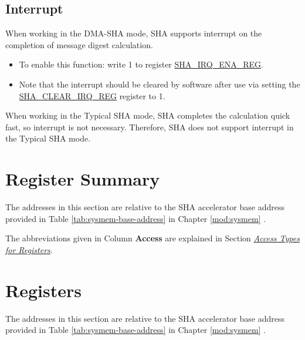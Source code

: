 \documentclass[main\_\_EN.tex]{subfiles}
\begin{document}
\subsection{Interrupt}

When working in the DMA-SHA mode, SHA supports interrupt on the completion of message digest calculation. 
\begin{itemize}
    \item To enable this function: write 1 to register \hyperref[regdesc:SHAIRQENAREG]{SHA\_IRQ\_ENA\_REG}. 
    \item Note that the interrupt should be cleared by software after use via setting the \hyperref[regdesc:SHACLEARIRQREG]{SHA\_CLEAR\_IRQ\_REG} register to 1.
\end{itemize}  

When working in the Typical SHA mode, SHA completes the calculation quick fast, so interrupt is not necessary. Therefore, SHA does not support interrupt in the Typical SHA mode.


\clearpage
\hypertarget{sha-reg-summ}{}
\section{Register Summary} \label{sec:sha-reg-summ} 

The addresses in this section are relative to the SHA accelerator base address provided in Table \ref{tab:sysmem-base-address} in Chapter \ref{mod:sysmem} \textit{}.

The abbreviations given in Column \textbf{Access} are explained in Section \hyperref[glossary-access-types]{\textit{Access Types for Registers}}.



\section{Registers}

The addresses in this section are relative to the SHA accelerator base address provided in Table \ref{tab:sysmem-base-address} in Chapter \ref{mod:sysmem} \textit{}.


\end{document}

